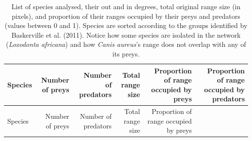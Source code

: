 \documentclass[10pt,oneside]{article}
\begin{document}
\hypertarget{tbl:everyone}{}
\begin{longtable}[]{@{}lrrrrr@{}}
\caption{\label{tbl:everyone}List of species analysed, their out and in
degrees, total original range size (in pixels), and proportion of their
ranges occupied by their preys and predators (values between 0 and 1).
Species are sorted according to the groups identified by Baskerville et
al. (2011). Notice how some species are isolated in the network
(\emph{Loxodonta africana}) and how \emph{Canis aureus}'s range does not
overlap with any of its preys.}\tabularnewline
\toprule
\begin{minipage}[b]{0.28\columnwidth}\raggedright
Species\strut
\end{minipage} & \begin{minipage}[b]{0.10\columnwidth}\raggedleft
Number of preys\strut
\end{minipage} & \begin{minipage}[b]{0.10\columnwidth}\raggedleft
Number of predators\strut
\end{minipage} & \begin{minipage}[b]{0.10\columnwidth}\raggedleft
Total range size\strut
\end{minipage} & \begin{minipage}[b]{0.13\columnwidth}\raggedleft
Proportion of range occupied by preys\strut
\end{minipage} & \begin{minipage}[b]{0.13\columnwidth}\raggedleft
Proportion of range occupied by predators\strut
\end{minipage}\tabularnewline
\midrule
\endfirsthead
\toprule
\begin{minipage}[b]{0.28\columnwidth}\raggedright
Species\strut
\end{minipage} & \begin{minipage}[b]{0.10\columnwidth}\raggedleft
Number of preys\strut
\end{minipage} & \begin{minipage}[b]{0.10\columnwidth}\raggedleft
Number of predators\strut
\end{minipage} & \begin{minipage}[b]{0.10\columnwidth}\raggedleft
Total range size\strut
\end{minipage} & \begin{minipage}[b]{0.13\columnwidth}\raggedleft
Proportion of range occupied by preys\strut
\end{minipage} & \begin{minipage}[b]{0.13\columnwidth}\raggedleft

\end{minipage}
\end{longtable}
\end{document}
